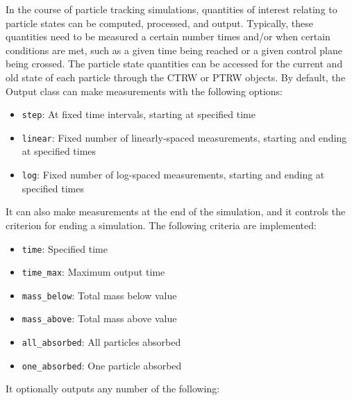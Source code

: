 \documentclass[11pt]{article}
\begin{document}
In the course of particle tracking simulations, quantities of interest relating to particle states can be computed, processed, and output. Typically, these quantities need to be measured a certain number times and/or when certain conditions are met, such as a given time being reached or a given control plane being crossed. The particle state quantities can be accessed for the current and old state of each particle through the CTRW or PTRW objects. By default, the Output class can make measurements with the following options:
%
\begin{itemize}
\item \lstinline{step}: At fixed time intervals, starting at specified time
\item \lstinline{linear}: Fixed number of linearly-spaced measurements, starting and ending at specified times
\item \lstinline{log}: Fixed number of log-spaced measurements, starting and ending at specified times
\end{itemize}
It can also make measurements at the end of the simulation, and it controls the criterion for ending a simulation. The following criteria are implemented:
%
\begin{itemize}
\item \lstinline{time}: Specified time
\item \lstinline{time_max}: Maximum output time
\item \lstinline{mass_below}: Total mass below value
\item \lstinline{mass_above}: Total mass above value
\item \lstinline{all_absorbed}: All particles absorbed
\item \lstinline{one_absorbed}: One particle absorbed
\end{itemize}
It optionally outputs any number of the following:
%
\end{document}
